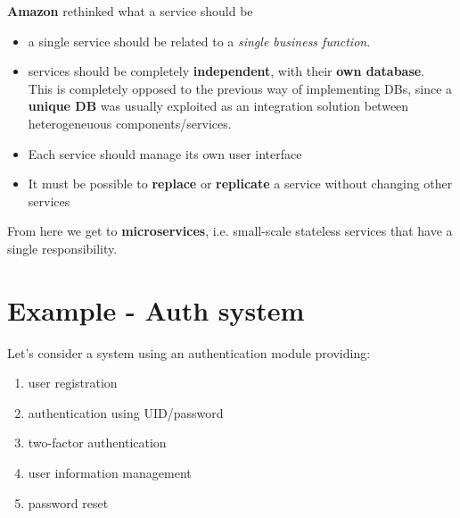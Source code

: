 \textbf{Amazon} rethinked what a service should be
\begin{itemize}
   \item a single service should be related to a \textit{single business function}.
   \item services should be completely \textbf{independent}, with their \textbf{own database}.\\
   This is completely opposed to the previous way of implementing DBs,
   since a \textbf{unique DB} was usually exploited as an integration solution between heterogeneuous components/services.
   \item Each service should manage its own user interface
   \item It must be possible to \textbf{replace} or \textbf{replicate} a service without changing other services
\end{itemize}
   
From here we get to \textbf{microservices}, 
i.e. small-scale stateless services that have a single responsibility.

\section{Example - Auth system}
Let's consider a system using an authentication module providing:
\begin{enumerate}
   \item user registration
   \item authentication using UID/password
   \item two-factor authentication
   \item user information management
   \item password reset
\end{enumerate}


